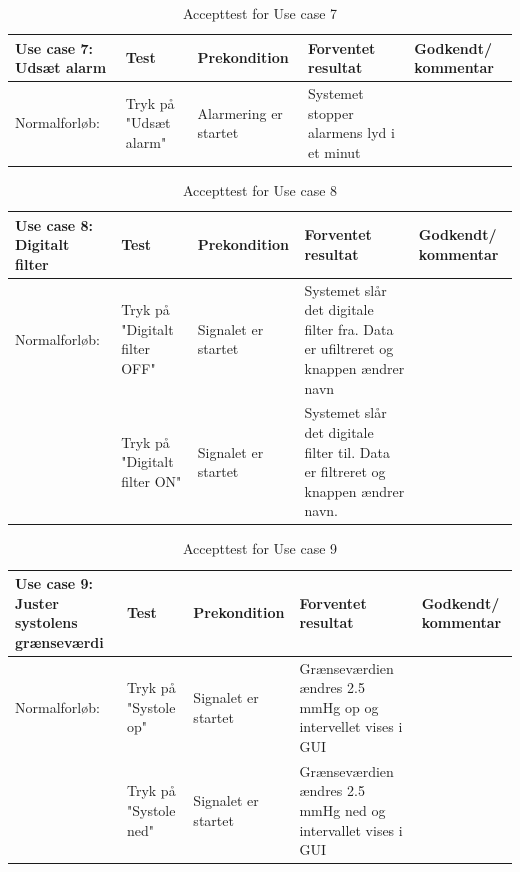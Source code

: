 \begin{table}[H]
\caption{Accepttest for Use case 7}\label{tab:tabel8}
\begin{tabular}{|>{\raggedright\arraybackslash}p{2.5cm}| >{\raggedright\arraybackslash}p{2.9cm} | >{\raggedright\arraybackslash}p{2.9cm} | >{\raggedright\arraybackslash}p{2.9cm} | >{\raggedright\arraybackslash}p{2.8cm} |}
   \hline
   \textbf{Use case 7: Udsæt alarm } &\textbf{Test}& \textbf{Prekondition} & \textbf{Forventet resultat} & \textbf{Godkendt/ kommentar}\\ \hline
   Normalforløb:& Tryk på "Udsæt alarm" & Alarmering er startet & Systemet stopper alarmens lyd i et minut &\\\hline
\end{tabular}
\end{table}

\begin{table}[H]
\caption{Accepttest for Use case 8}\label{tab:tabel8}
\begin{tabular}{|>{\raggedright\arraybackslash}p{2.5cm}| >{\raggedright\arraybackslash}p{2.9cm} | >{\raggedright\arraybackslash}p{2.9cm} | >{\raggedright\arraybackslash}p{2.9cm} | >{\raggedright\arraybackslash}p{2.8cm} |}
   \hline
   \textbf{Use case 8: Digitalt filter } &\textbf{Test}& \textbf{Prekondition} & \textbf{Forventet resultat} & \textbf{Godkendt/ kommentar}\\ \hline
   Normalforløb:& Tryk på "Digitalt filter OFF" & Signalet er startet & Systemet slår det digitale filter fra. Data er ufiltreret og knappen ændrer navn &\\\hline
   &Tryk på "Digitalt filter ON" & Signalet er startet & Systemet slår det digitale filter til. Data er filtreret og knappen ændrer navn. &\\\hline
\end{tabular}
\end{table}


\begin{table}[H]
\caption{Accepttest for Use case 9}\label{tab:tabel8}
\begin{tabular}{|>{\raggedright\arraybackslash}p{2.5cm}| >{\raggedright\arraybackslash}p{2.9cm} | >{\raggedright\arraybackslash}p{2.9cm} | >{\raggedright\arraybackslash}p{2.9cm} | >{\raggedright\arraybackslash}p{2.8cm} |}
   \hline
   \textbf{Use case 9: Juster systolens grænseværdi } &\textbf{Test}& \textbf{Prekondition} & \textbf{Forventet resultat} & \textbf{Godkendt/ kommentar}\\ \hline
   Normalforløb:& Tryk på "Systole op"& Signalet er startet & Grænseværdien ændres 2.5 mmHg op og intervellet vises i GUI &\\\hline
   &Tryk på "Systole ned" & Signalet er startet & Grænseværdien ændres 2.5 mmHg ned og intervallet vises i GUI & \\\hline
\end{tabular}
\end{table}

